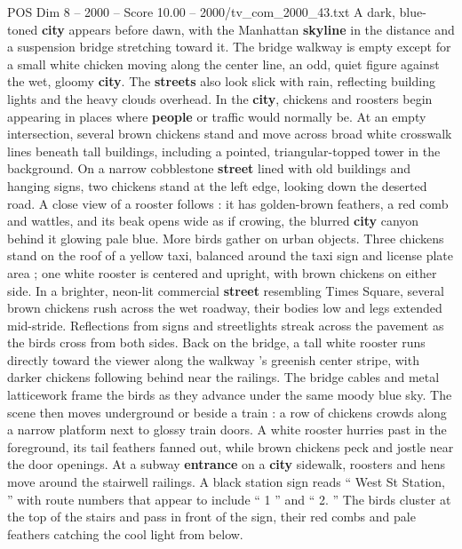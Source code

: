 \begin{textsample}{POS Dim 8 – 2000 – Score 10.00 – 2000/tv\_com\_2000\_43.txt}  \label{ex:f8_pos_006}
A dark, blue-toned \textbf{city} appears before dawn, with the Manhattan \textbf{skyline} in the distance and a suspension bridge stretching toward it.
The bridge walkway is empty except for a small white chicken moving along the center line, an odd, quiet figure against the wet, gloomy \textbf{city}.
The \textbf{streets} also look slick with rain, reflecting building lights and the heavy clouds overhead.
In the \textbf{city}, chickens and roosters begin appearing in places where \textbf{people} or traffic would normally be.
At an empty intersection, several brown chickens stand and move across broad white crosswalk lines beneath tall buildings, including a pointed, triangular-topped tower in the background.
On a narrow cobblestone \textbf{street} lined with old buildings and hanging signs, two chickens stand at the left edge, looking down the deserted road.
A close view of a rooster follows : it has golden-brown feathers, a red comb and wattles, and its beak opens wide as if crowing, the blurred \textbf{city} canyon behind it glowing pale blue.
More birds gather on urban objects.
Three chickens stand on the roof of a yellow taxi, balanced around the taxi sign and license plate area ; one white rooster is centered and upright, with brown chickens on either side.
In a brighter, neon-lit commercial \textbf{street} resembling Times Square, several brown chickens rush across the wet roadway, their bodies low and legs extended mid-stride.
Reflections from signs and streetlights streak across the pavement as the birds cross from both sides.
Back on the bridge, a tall white rooster runs directly toward the viewer along the walkway ’s greenish center stripe, with darker chickens following behind near the railings.
The bridge cables and metal latticework frame the birds as they advance under the same moody blue sky.
The scene then moves underground or beside a train : a row of chickens crowds along a narrow platform next to glossy train doors.
A white rooster hurries past in the foreground, its tail feathers fanned out, while brown chickens peck and jostle near the door openings.
At a subway \textbf{entrance} on a \textbf{city} sidewalk, roosters and hens move around the stairwell railings.
A black station sign reads “ West St Station, ” with route numbers that appear to include “ 1 ” and “ 2. ” The birds cluster at the top of the stairs and pass in front of the sign, their red combs and pale feathers catching the cool light from below.

\end{textsample}
